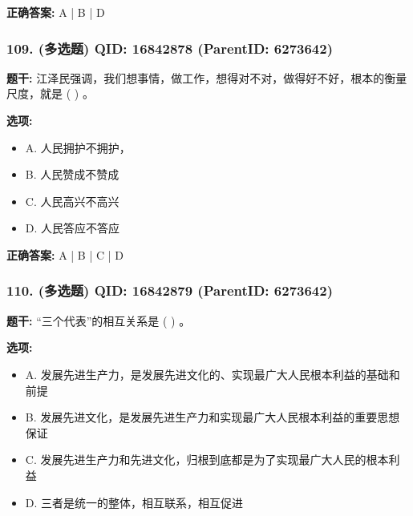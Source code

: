 \documentclass[12pt,UTF8]{ctexart}
\begin{document}
\textbf{正确答案:}
A | B | D

\vspace{0.3em}\hrulefill\vspace{0.7em}

\subsubsection*{109. (多选题) \small QID: 16842878 (ParentID: 6273642)}

\textbf{题干:}
江泽民强调，我们想事情，做工作，想得对不对，做得好不好，根本的衡量尺度，就是 ( ) 。



\textbf{选项:}
\begin{itemize}[leftmargin=*]

  \item A. 人民拥护不拥护，

  \item B. 人民赞成不赞成

  \item C. 人民高兴不高兴

  \item D. 人民答应不答应

\end{itemize}

\textbf{正确答案:}
A | B | C | D

\vspace{0.3em}\hrulefill\vspace{0.7em}

\subsubsection*{110. (多选题) \small QID: 16842879 (ParentID: 6273642)}

\textbf{题干:}
“三个代表”的相互关系是 ( ) 。



\textbf{选项:}
\begin{itemize}[leftmargin=*]

  \item A. 发展先进生产力，是发展先进文化的、实现最广大人民根本利益的基础和前提

  \item B. 发展先进文化，是发展先进生产力和实现最广大人民根本利益的重要思想保证

  \item C. 发展先进生产力和先进文化，归根到底都是为了实现最广大人民的根本利益

  \item D. 三者是统一的整体，相互联系，相互促进

\end{itemize}
\end{document}
